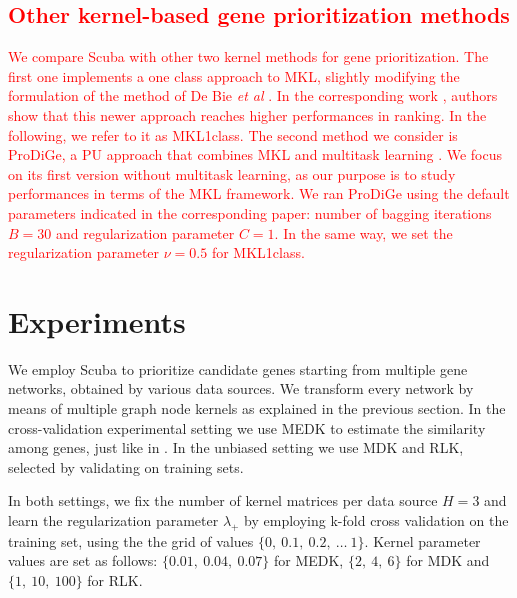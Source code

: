 \textcolor{red}{\subsection*{Other kernel-based gene prioritization methods}
We compare Scuba with other two kernel methods for gene prioritization. The first one implements a one class approach to MKL, slightly modifying the formulation of the method of De Bie \emph{et al} \cite{debie}. In the corresponding work \cite{mkl1class}, authors show that this newer approach reaches higher performances in ranking. In the following, we refer to it as MKL1class. The second method we consider is ProDiGe, a PU approach that combines MKL and multitask learning \cite{prodige}. We focus on its first version without multitask learning, as our purpose is to study performances in terms of the MKL framework. We ran ProDiGe using the default parameters indicated in the corresponding paper: number of bagging iterations $B=30$ and regularization parameter $C=1$. In the same way, we set the regularization parameter $\nu=0.5$ for MKL1class.}
\section{Experiments}
We employ Scuba to prioritize candidate genes starting from multiple gene networks, obtained by various data sources. We transform every network by means of multiple graph node kernels as explained in the previous section. In the cross-validation experimental setting we use MEDK to estimate the similarity among genes, just like in \cite{f3pc}. In the unbiased setting we use MDK and RLK, selected by validating on training sets.

In both settings, we fix the number of kernel matrices per data source $H=3$ and learn the regularization parameter $\lambda_{+}$ by employing k-fold cross validation on the training set, using the the grid of values $\lbrace 0, \ 0.1,\ 0.2,\ \ldots \ 1 \rbrace$. Kernel parameter values are set as follows: $\lbrace 0.01,\ 0.04,\ 0.07 \rbrace$ for MEDK, $\lbrace 2,\ 4,\ 6 \rbrace$ for MDK and $\lbrace 1,\ 10,\ 100 \rbrace$ for RLK.

